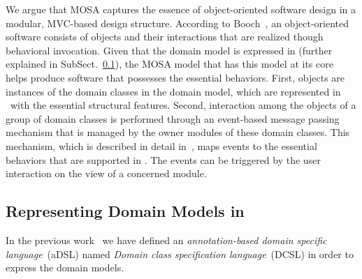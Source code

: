 We argue that MOSA captures the essence of object-oriented software design in a modular, MVC-based design structure. According to Booch~\cite{booch_object-oriented_1986}, an object-oriented software consists of objects and their interactions that are realized though behavioral invocation. Given that the domain model is expressed in \dcsl (further explained in SubSect.~\ref{sect:bg-dcsl}), the MOSA model that has this model at its core helps produce software that possesses the essential behaviors. First, objects are instances of the domain classes in the domain model, which are represented in \dcsl~with the essential structural features. Second, interaction among the objects of a group of domain classes is performed through an event-based message passing mechanism that is managed by the owner modules of these domain classes. This mechanism, which is described in detail in~\cite{le_jdomainapp_2017}, maps events to the essential behaviors that are supported in \dcsl. The events can be triggered by the user interaction on the view of a concerned module. %
%

\subsection{Representing Domain Models in \dcsl}
\label{sect:bg-dcsl}

In the previous work~\cite{le_domain_2018} we have defined an \textit{annotation-based domain specific language}~(aDSL) named \textit{Domain class specification language}~(DCSL) in order to express the domain models. 

